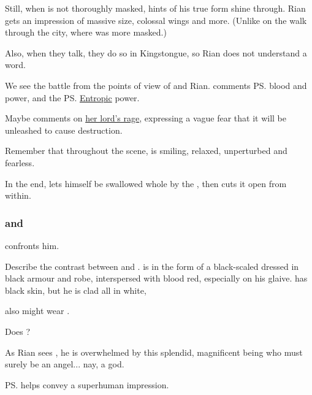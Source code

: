 \begin{garbage}
Still, when \Ishnaruchaefir{} is not thoroughly masked, hints of his true form shine through. Rian gets an impression of massive size, colossal wings and more. (Unlike on the walk through the city, where \Ishnaruchaefir{} was more masked.)

Also, when they talk, they do so in \Draconic{} Kingstongue, so Rian does not understand a word.

We see the battle from the points of view of \Criseis{} and Rian. \Criseis{} comments \ps{\Ishnaruchaefir} \xzaishannic{} blood and power, and the \ps{\ghobal} \Erebean{} \hyperref[Entropy]{Entropic} power. 

Maybe \Criseis{} comments on \hyperref[Ishnaruchaefir's rage]{her lord's rage}, expressing a vague fear that it will be unleashed to cause destruction.

Remember that throughout the scene, \Ishnaruchaefir{} is smiling, relaxed, unperturbed and fearless.

In the end, \Ishnaruchaefir{} lets himself be swallowed whole by the \ghobal, then cuts it open from within. 





\subsubsection[Ishnaruchaefir and Teshrial]{\Ishnaruchaefir{} and \Teshrial}
\Teshrial{} confronts him. 

Describe the contrast between \Ishnaruchaefir{} and \Teshrial. \Ishnaruchaefir{} is in the form of a black-scaled \scatha{} dressed in black armour and robe, interspersed with blood red, especially on his glaive. 
\Teshrial{} has black skin, but he is clad all in white, 

\Teshrial{} also might wear . 

Does \Teshrial{} ?

As Rian sees \Teshrial, he is overwhelmed by this splendid, magnificent being who must surely be an angel... nay, a god. 


\ps{\Teshrial}  helps convey a superhuman impression. 


\end{garbage}
